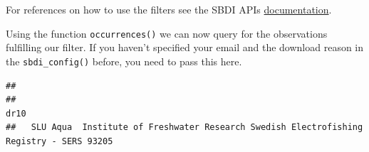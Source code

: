\documentclass[
  10pt,
]{article}
\newenvironment{Shaded}{\begin{snugshade}}{\end{snugshade}}
\newcommand{\AttributeTok}[1]{\textcolor[rgb]{0.77,0.63,0.00}{#1}}
\newcommand{\CommentTok}[1]{\textcolor[rgb]{0.56,0.35,0.01}{\textit{#1}}}
\newcommand{\DecValTok}[1]{\textcolor[rgb]{0.00,0.00,0.81}{#1}}
\newcommand{\FunctionTok}[1]{\textcolor[rgb]{0.00,0.00,0.00}{#1}}
\newcommand{\NormalTok}[1]{#1}
\newcommand{\OtherTok}[1]{\textcolor[rgb]{0.56,0.35,0.01}{#1}}
\newcommand{\SpecialCharTok}[1]{\textcolor[rgb]{0.00,0.00,0.00}{#1}}
\newcommand{\StringTok}[1]{\textcolor[rgb]{0.31,0.60,0.02}{#1}}
\begin{document}
For references on how to use the filters see the SBDI APIs \href{https://api.biodiversitydata.se/?lang=en-US\#ws3}{documentation}.

Using the function \texttt{occurrences()} we can now query for the observations fulfilling our filter. If you haven't specified your email and the download reason in the \texttt{sbdi\_config()} before, you need to pass this here.

\begin{Shaded}
\end{Shaded}

\begin{verbatim}
##                                                                                    
##                                                                                      dr10
##   SLU Aqua  Institute of Freshwater Research Swedish Electrofishing Registry - SERS 93205
\end{verbatim}

\begin{Shaded}
\end{Shaded}
\end{document}
